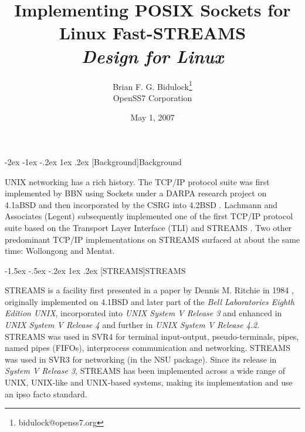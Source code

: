 \documentclass[letterpaper,final,notitlepage,twocolumn,10pt,twoside]{article}
\makeatletter
\renewcommand\section{\@startsection {section}{1}{\z@}%
                                   {-2ex \@plus -1ex \@minus -.2ex}%
                                   {1ex \@plus .2ex}%
                                   {\normalfont\large\bfseries}}
\renewcommand\subsection{\@startsection{subsection}{2}{\z@}%
                                     {-1.5ex \@plus -.5ex \@minus -.2ex}%
                                     {1ex \@plus .2ex}%
                                     {\normalfont\normalsize\bfseries}}
\makeatother
\begin{document}

\title{Implementing POSIX Sockets for Linux Fast-STREAMS\\[0.5ex]
	{\large \textsl{Design for Linux}}}
\author{Brian F. G. Bidulock\thanks{bidulock@openss7.org}\\
	OpenSS7 Corporation}
\date{May 1, 2007}
\maketitle

\begin{abstract}
\end{abstract}


\section[Background]{Background}

UNIX networking has a rich history.  The TCP/IP protocol suite was first
implemented by BBN using Sockets under a DARPA research project on 4.1aBSD and
then incorporated by the CSRG into 4.2BSD \cite[]{bsd}.  Lachmann and
Associates (Legent) subsequently implemented one of the first TCP/IP protocol
suite based on the Transport Layer Interface (TLI) \cite[]{tli} and STREAMS
\cite[]{magic}.  Two other predominant TCP/IP implementations on STREAMS
surfaced at about the same time: Wollongong and Mentat.

\subsection[STREAMS]{STREAMS}

STREAMS is a facility first presented in a paper by Dennis M. Ritchie in 1984
\cite[]{Ritchie84}, originally implemented on 4.1BSD and later part of the
\textsl{Bell Laboratories Eighth Edition UNIX}, incorporated into \textsl{UNIX
System V Release 3} and enhanced in \textsl{UNIX System V Release 4} and
further in \textsl{UNIX System V Release 4.2}.  STREAMS was used in SVR4 for
terminal input-output, pseudo-terminals, pipes, named pipes (FIFOs),
interprocess communication and networking.  STREAMS was used in SVR3 for
networking (in the NSU package).  Since its release in \textsl{System V
Release 3}, STREAMS has been implemented across a wide range of UNIX,
UNIX-like and UNIX-based systems, making its implementation and use an ipso
facto standard.
\end{document}
